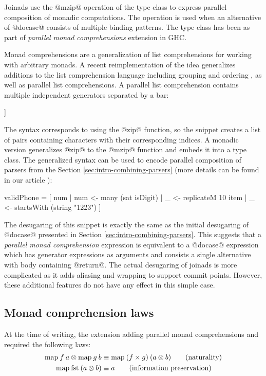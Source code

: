 \documentclass[preprint]{sigplanconf}
\begin{document}
Joinads use the @mzip@ operation of the  type class to express parallel composition 
of monadic computations. The operation is used when an alternative of @docase@ consists of multiple 
binding patterns. The type class has been as part of \textit{parallel monad comprehensions} 
\cite{bringbackmc, comprefun} extension in GHC.

Monad comprehensions \cite{comprehendingmonads} are a generalization of list comprehensions for 
working with arbitrary monads. A recent reimplementation of the idea generalizes additions to the 
list comprehension language including grouping and ordering \cite{groupordercompre}, as well as 
parallel list comprehensions. A parallel list comprehension contains multiple independent generators 
separated by a bar:

\begin{code}
[ (i, c) | c <- ``Hello world!'' | i <- [ 0 .. ] ]
\end{code}
The syntax corresponds to using the @zip@ function, so the snippet creates a list of 
pairs containing characters with their corresponding indices. A monadic version generalizes @zip@
to the @mzip@ function and embeds it into a  type class. The generalized syntax 
can be used to encode parallel composition of parsers from the Section \ref{sec:intro-combining-parsers}
(more details can be found in our article \cite{parcomprefun}):

\begin{code}
validPhone = 
  [ num  | num  <- many (sat isDigit) 
         | _    <- replicateM 10 item
         | _    <- startsWith (string "1223") ]
\end{code}
The desugaring of this snippet is exactly the same as the initial desugaring of @docase@ presented in 
Section \ref{sec:intro-combining-parsers}. This suggests that a \textit{parallel monad comprehension}
expression is equivalent to a @docase@ expression which has generator expressions as arguments and 
consists a single alternative with body containing @return@. The actual desugaring of joinads is more 
complicated as it adds aliasing and wrapping to support commit points. However, these additional 
features do not have any effect in this simple case.

\subsection{Monad comprehension laws} 
At the time of writing, the extension adding parallel monad comprehensions and 
 required the following laws:
\begin{align*}
  \text{map} \: f \: a \otimes \text{map} \: g \: b &\equiv \text{map} \: (f \times g) \: (a \otimes b) \tag{naturality} \\
  \text{map} \: \text{fst} \: (a \otimes b) &\equiv a \tag{information preservation} 
\end{align*}
\end{document}
